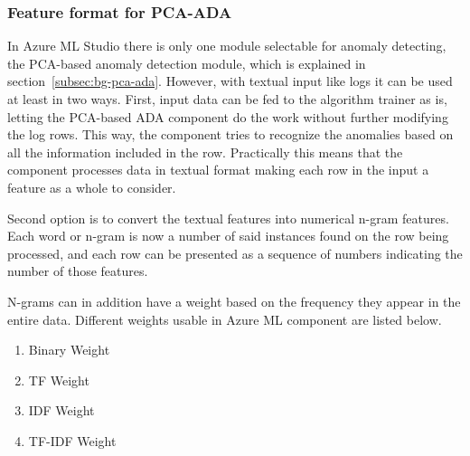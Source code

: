 

\subsubsection*{Feature format for PCA-ADA}
In Azure ML Studio
there is only one module selectable
for anomaly detecting,
the PCA-based anomaly detection module,
which is explained in section~\ref{subsec:bg-pca-ada}.
However,
with textual input like logs
it can be used at least in two ways.
First,
input data can be fed to
the algorithm trainer as is,
letting the PCA-based ADA component %
do the work without further modifying the log rows.
This way,
the component tries to recognize the anomalies
based on all the information included in the row.
Practically this means
that the component processes data in textual format
making each row in the input
a feature as a whole
to consider.

Second option is to
convert the textual features
into numerical n-gram features.
Each word or n-gram
is now a number of said instances found on
the row being processed,
and each row can be presented
as a sequence of numbers
indicating the number of those features.

N-grams can in addition have a weight
based on the frequency they appear
in the entire data.
Different weights usable in Azure ML component
are listed below.

\begin{enumerate}
    \item Binary Weight
    \item TF Weight
    \item IDF Weight
    \item TF-IDF Weight
\end{enumerate}


%

